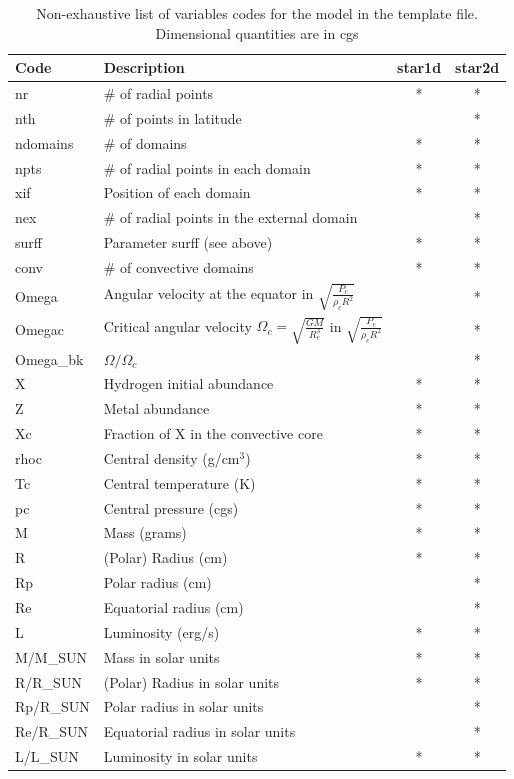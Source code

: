 \begin{longtable}{|l|p{8cm}|c|c|}
\caption{Non-exhaustive list of variables codes for the model in the template
file. Dimensional quantities are in cgs}\\
\hline
\bf Code&\bf Description&\bf star1d&\bf star2d\\
\hline\hline
nr&\# of radial points&*&*\\
\hline
nth&\# of points in latitude&&*\\
\hline
ndomains&\# of domains&*&*\\
\hline
npts&\# of radial points in each domain&*&*\\
\hline
xif&Position of each domain&*&*\\
\hline
nex&\# of radial points in the external domain&&*\\
\hline
surff&Parameter surff (see above)&*&*\\
\hline
conv&\# of convective domains&*&*\\
\hline
Omega&Angular velocity at the equator in $\sqrt{\frac{P_c}{\rho_cR^2}}$&&*\\
\hline
Omegac&Critical angular velocity $\Omega_c=\sqrt{\frac{GM}{R_e^3}}$ in $\sqrt{\frac{P_c}{\rho_cR^2}}$&&*\\
\hline
Omega\_bk& $\Omega/\Omega_c$   &&*\\
\hline
X&Hydrogen initial abundance&*&*\\
\hline
Z&Metal abundance&*&*\\
\hline
Xc&Fraction of X in the convective core&*&*\\
\hline
rhoc&Central density (g/cm$^3$)&*&*\\
\hline
Tc&Central temperature (K)&*&*\\
\hline
pc&Central pressure (cgs)&*&*\\
\hline
M&Mass (grams)&*&*\\
\hline
R&(Polar) Radius (cm)&*&*\\
\hline
Rp&Polar radius (cm)&&*\\
\hline
Re&Equatorial radius (cm)&&*\\
\hline
L&Luminosity (erg/s)&*&*\\
\hline
M/M\_SUN&Mass in solar units&*&*\\
\hline
R/R\_SUN&(Polar) Radius in solar units&*&*\\
\hline
Rp/R\_SUN&Polar radius in solar units&&*\\
\hline
Re/R\_SUN&Equatorial radius in solar units&&*\\
\hline
L/L\_SUN&Luminosity in solar units&*&*\\

\end{longtable}
